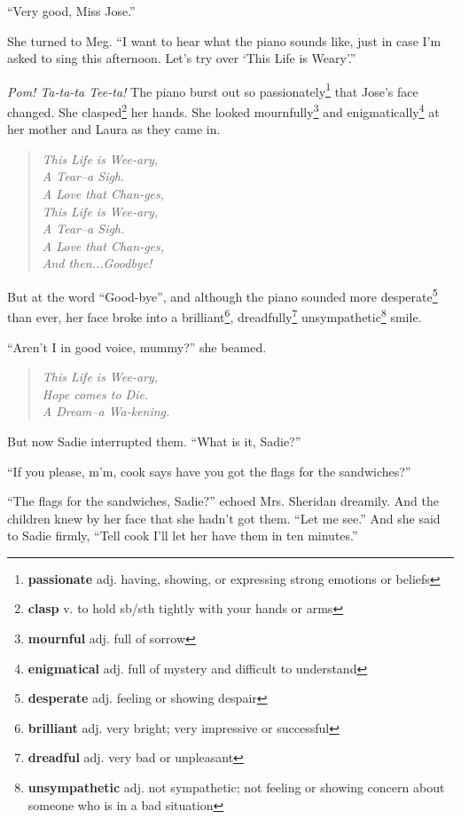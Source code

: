 ``Very good, Miss Jose.''

She turned to Meg. ``I want to hear what the piano sounds like, just in case I'm asked to sing this afternoon. Let's try over `This Life is Weary'.''

\textit{Pom! Ta-ta-ta Tee-ta!} The piano burst out so passionately\footnote{\textbf{passionate} adj. having, showing, or expressing strong emotions or beliefs} that Jose's face changed. She clasped\footnote{\textbf{clasp} v. to hold sb/sth tightly with your hands or arms} her hands. She looked mournfully\footnote{\textbf{mournful} adj. full of sorrow} and enigmatically\footnote{\textbf{enigmatical} adj. full of mystery and difficult to understand} at her mother and Laura as they came in.

\begin{verse}
\textit{This Life is Wee-ary,\\}
\textit{A Tear--a Sigh.\\}
\textit{A Love that Chan-ges,\\}
\textit{This Life is Wee-ary,\\}
\textit{A Tear--a Sigh.\\}
\textit{A Love that Chan-ges,\\}
\textit{And then...Goodbye!}
\end{verse}

But at the word ``Good-bye'', and although the piano sounded more desperate\footnote{\textbf{desperate} adj. feeling or showing despair} than ever, her face broke into a brilliant\footnote{\textbf{brilliant} adj. very bright; very impressive or successful}, dreadfully\footnote{\textbf{dreadful} adj. very bad or unpleasant} unsympathetic\footnote{\textbf{unsympathetic} adj. not sympathetic; not feeling or showing concern about someone who is in a bad situation} smile.

``Aren't I in good voice, mummy?'' she beamed.

\begin{verse}
\textit{This Life is Wee-ary,\\}
\textit{Hope comes to Die.\\}
\textit{A Dream--a Wa-kening.}
\end{verse}

But now Sadie interrupted them. ``What is it, Sadie?''

``If you please, m'm, cook says have you got the flags for the sandwiches?''

``The flags for the sandwiches, Sadie?'' echoed Mrs. Sheridan dreamily. And the children knew by her face that she hadn't got them. ``Let me see.'' And she said to Sadie firmly, ``Tell cook I'll let her have them in ten minutes.''

